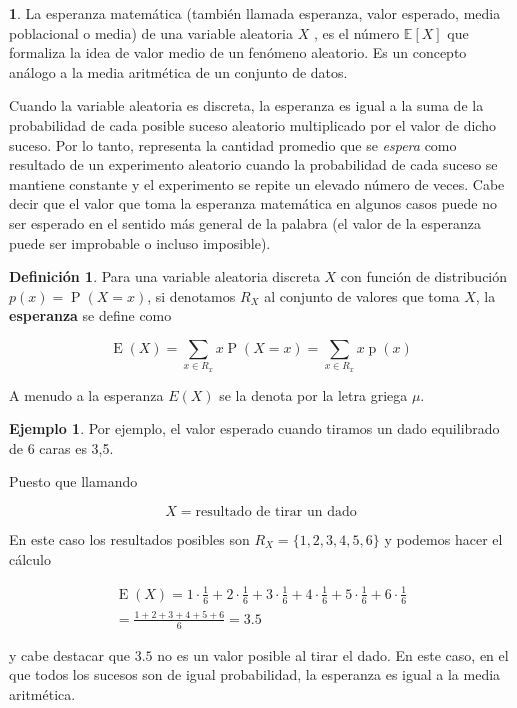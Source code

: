 \documentclass[]{book}
\theoremstyle{plain}
\theoremstyle{definition}
\newtheorem{definition}[theorem]{Definición}
\newtheorem{example}[theorem]{Ejemplo}
\theoremstyle{definition} %
\newcommand{\thistheoremname}{}
\newtheorem{genericthm}[theorem]{\thistheoremname}
\newenvironment{customdef}[1]
  {\renewcommand{\thistheoremname}{#1}%
   \begin{genericthm}}
  {\end{genericthm}}
\begin{document}
\begin{customdef}{Definición intuitiva de esperanza}
La esperanza matemática (también llamada esperanza, valor
esperado, media poblacional o media) de una variable aleatoria \(X\) ,
es el número \(\displaystyle \mathbb {E} [X]\) que formaliza la idea de
valor medio de un fenómeno aleatorio. Es un concepto análogo a la media
aritmética de un conjunto de datos.

Cuando la variable aleatoria es discreta, la esperanza es igual a la
suma de la probabilidad de cada posible suceso aleatorio multiplicado
por el valor de dicho suceso. Por lo tanto, representa la cantidad
promedio que se \emph{espera} como resultado de un experimento aleatorio
cuando la probabilidad de cada suceso se mantiene constante y el
experimento se repite un elevado número de veces. Cabe decir que el
valor que toma la esperanza matemática en algunos casos puede no ser
esperado en el sentido más general de la palabra (el valor de la
esperanza puede ser improbable o incluso imposible).
\end{customdef}

\begin{definition}
  
Para una variable aleatoria discreta \(X\) con función de distribución
\(p(x)= \displaystyle \operatorname {P} (X=x)\), si denotamos $R_X$ al conjunto de valores que toma $X$,
 la \textbf{esperanza} se define como

\[\displaystyle \operatorname {E} (X)=\sum _{x \in R_x}x\operatorname {P} (X=x) = \sum _{x \in R_x}x\operatorname {p} (x)\]

A menudo a la esperanza $E(X)$ se la denota por la letra griega $\mu$.
\end{definition}

\begin{example}
Por ejemplo, el valor esperado cuando tiramos un dado equilibrado de 6
caras es 3,5. 

Puesto que llamando

\[X=\text{resultado de tirar un dado}\]

En este caso los resultados posibles son $R_X = \{1, 2,3,4,5,6\}$ y podemos hacer el cálculo

\[\displaystyle \begin{aligned}\operatorname {E} (X)=1\cdot {\frac {1}{6}}+2\cdot {\frac {1}{6}}+3\cdot {\frac {1}{6}}+4\cdot {\frac {1}{6}}+5\cdot {\frac {1}{6}}+6\cdot {\frac {1}{6}}\\[6pt]={\frac {1+2+3+4+5+6}{6}}=3.5\end{aligned}\]

y cabe destacar que \(3.5\) no es un valor posible al tirar el dado. En
este caso, en el que todos los sucesos son de igual probabilidad, la
esperanza es igual a la media aritmética.
\end{example}
\end{document}
